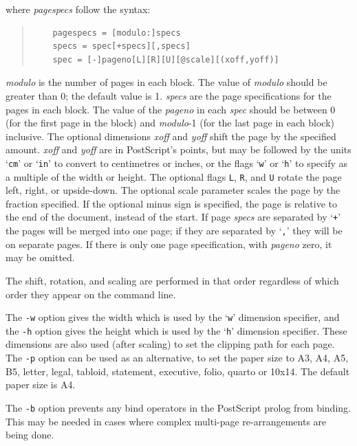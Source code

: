 \documentclass[twoside,11pt]{article}
\begin{document}
\begin{itemize}
where {\em pagespecs} follow the syntax: 

\small
\begin{quote}
\begin{verbatim}
    pagespecs = [modulo:]specs 
    specs = spec[+specs][,specs] 
    spec = [-]pageno[L][R][U][@scale][(xoff,yoff)] 
\end{verbatim}
\end{quote}
\normalsize

{\em modulo} is the number of pages in each block. The value of {\em modulo} should be greater than 0; the default value is 1. {\em specs} are the page specifications for the pages in each block. The value of the {\em pageno} in each {\em spec} should be between 0 (for the first page in the block) and {\em modulo}-1 (for the last page in each block) inclusive. The optional dimensions {\em xoff} and {\em yoff} shift the page by the specified amount. {\em xoff} and {\em yoff} are in PostScript's points, but may be followed by the units `{\tt cm}' or `{\tt in}' to convert to centimetres or inches, or the flags `{\tt w}' or `{\tt h}' to specify as a multiple of the width or height. The optional flags {\tt L}, {\tt R}, and {\tt U} rotate the page left, right, or upside-down. The optional scale parameter scales the page by the fraction specified. If the optional minus sign is specified, the page is relative to the end of the document, instead of the start. If page {\em specs} are separated by `{\tt +}' the pages will be merged into one page; if they are separated by `{\tt ,}' they will be on separate pages. If there is only one page specification, with {\em pageno} zero, it may be omitted. 

The shift, rotation, and scaling are performed in that order regardless of which order they appear on the command line. 

The {\tt -w} option gives the width which is used by the `{\tt w}' dimension specifier, and the {\tt -h} option gives the height which is used by the `{\tt h}' dimension specifier. These dimensions are also used (after scaling) to set the clipping path for each page. The {\tt -p} option can be used as an alternative, to set the paper size to A3, A4, A5, B5, letter, legal, tabloid, statement, executive, folio, quarto or 10x14. The default paper size is A4. 

The {\tt -b} option prevents any bind operators in the PostScript prolog from binding. This may be needed in cases where complex multi-page re-arrangements are being done. 


\end{itemize}
\end{document}
